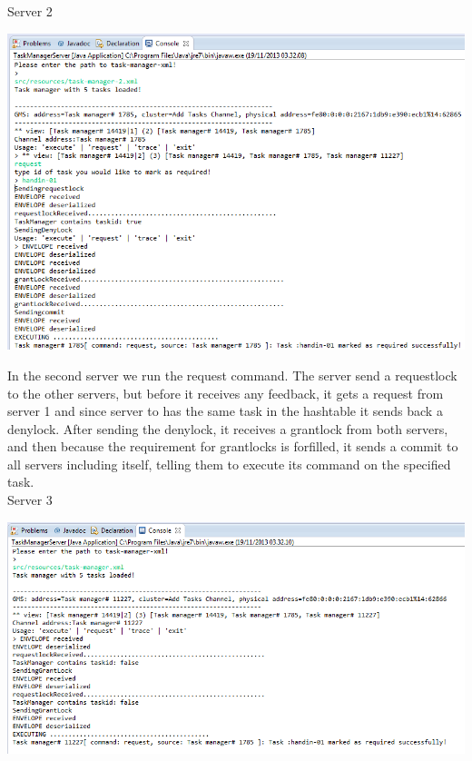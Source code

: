 \caption{Server 2}
\includegraphics[scale=0.6]{images/CCServer2.png}

In the second server we run the request command. The server send a requestlock to the other servers, but before it receives any feedback, it gets a request from server 1 and since server to has the same task in the hashtable it sends back a denylock. After sending the denylock, it receives a grantlock from both servers, and then because the requirement for grantlocks is forfilled, it sends a commit to all servers including itself, telling them to execute its command on the specified task. \\

\caption{Server 3}
\includegraphics[scale=0.6]{images/CCServer3.png}

